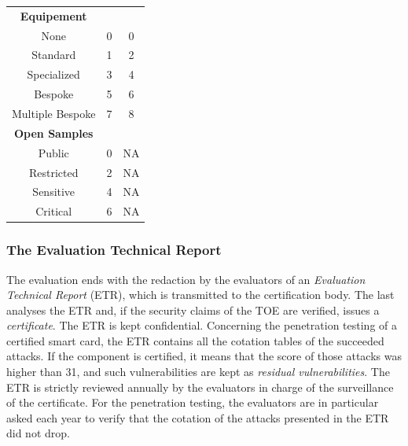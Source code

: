 \begin{table}[]
\begin{tabular}{ccc}
\midrule
\textbf{Equipement}           &                &              \\
None                          & 0              & 0            \\
Standard                      & 1              & 2            \\
Specialized                   & 3              & 4            \\
Bespoke                       & 5              & 6            \\
Multiple Bespoke              & 7              & 8            \\
\midrule
\textbf{Open Samples}         &                &              \\
Public                        & 0              & NA           \\
Restricted                    & 2              & NA           \\
Sensitive                     & 4              & NA           \\
Critical                      & 6              & NA    \\	
\bottomrule      
\end{tabular}
\end{table}


\subsubsection{The Evaluation Technical Report}
The evaluation ends with the redaction by the evaluators of an \emph{Evaluation Technical Report} (ETR), which is transmitted to the certification body. The last analyses the ETR and, if the security claims of the TOE are verified, issues a \emph{certificate}. The ETR is kept confidential. Concerning the penetration testing of a certified smart card, the ETR contains all the cotation tables of the succeeded attacks. If the component is certified, it means that the score of those attacks was higher than 31, and such vulnerabilities are kept as \emph{residual vulnerabilities}. The ETR is strictly reviewed annually by the evaluators in charge of the surveillance of the certificate. For the penetration testing, the evaluators are in particular asked each year to verify that the cotation of the attacks presented in the ETR did not drop.

